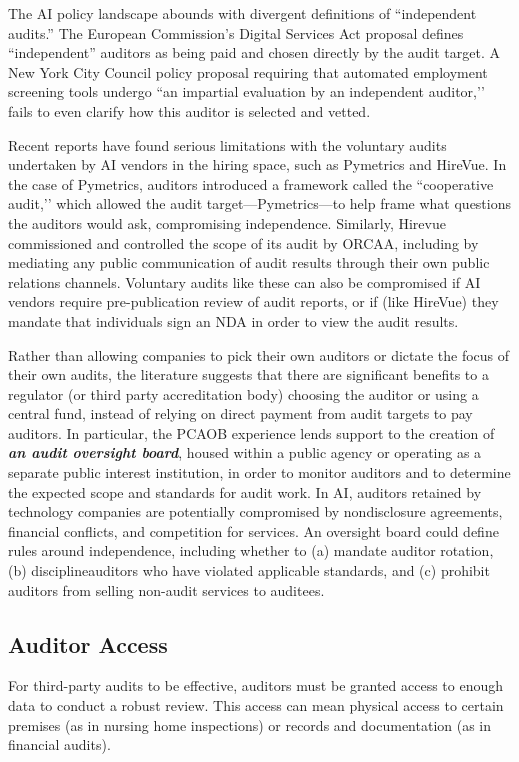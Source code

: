 \documentclass[sigconf]{acmart}
\begin{document}
The AI policy landscape abounds with divergent definitions of “independent audits.” 
The European Commission's Digital Services Act proposal defines “independent'' auditors as being paid and chosen directly by the audit target. 
A New York City Council policy proposal requiring that automated employment screening tools undergo “an impartial evaluation by an independent auditor,’’ fails to even clarify how this auditor is selected and vetted. 

Recent reports have found serious limitations with the voluntary audits undertaken by AI vendors in the hiring space, such as Pymetrics and HireVue. In the case of Pymetrics, 
auditors introduced a framework called the “cooperative audit,’’ which allowed the audit target—Pymetrics—to help frame what questions the auditors would ask, compromising independence. Similarly, Hirevue commissioned and controlled the scope of its audit by ORCAA, including by mediating any public communication of audit results through their own public relations channels. Voluntary audits like these can also be compromised if AI vendors require pre-publication review of audit reports, or if (like HireVue) they mandate that individuals sign an NDA in order to view the audit results. 

Rather than allowing companies to pick their own auditors or dictate the focus of their own audits, the literature suggests that there are significant benefits to a regulator (or third party accreditation body) choosing the auditor or using a central fund, instead of relying on direct payment from audit targets to pay auditors. In particular, the PCAOB experience lends support to the creation of \textbf{\textit{an audit oversight board}}, housed within a public agency or operating as a separate public interest institution, in order to monitor auditors and to determine the expected scope and standards for audit work. In AI, auditors retained by technology companies are potentially compromised by nondisclosure agreements, financial conflicts, and competition for services. An oversight board could define rules around independence, including whether to (a) mandate auditor rotation, (b) disciplineauditors who have violated applicable standards, and (c) prohibit auditors from selling non-audit services to auditees. 

\subsection{Auditor Access}

For third-party audits to be effective, auditors must be granted access to enough data to conduct a robust review. This access can mean physical access to certain premises (as in nursing home inspections) or records and documentation (as in financial audits). 
\end{document}
